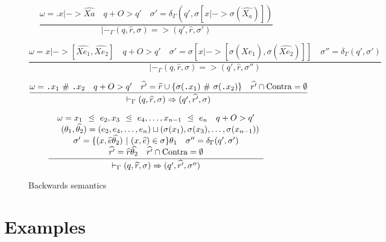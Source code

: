 \documentclass[10pt]{../sigplanconf}
\newcommand{\gen}{\ensuremath{~{\leq\kern-6pt \raisebox{1pt}{$\cdot$}}~}}
\newcommand{\w}[1]{\ensuremath{\widehat{#1}}}
\begin{document}
\begin{figure*}
  \centering
  \begin{equation*}
    \frac{
      \omega = \texttt{.}x |-> \w{Xa}
      \quad q +O> q'
      \quad \sigma' = \delta_\Gamma(q', \sigma[x |-> \sigma(\w{X_a})])
    }
    {
      |-_\Gamma (q, \w{r}, \sigma) => (q', \w{r}, \sigma')
    }
  \end{equation*}

  \begin{equation*}
    \frac{
      \omega = x |-> [\w{Xe_1}, \w{Xe_2}]
      \quad q +O> q'
      \quad \sigma' = \sigma[x |-> [\sigma(\w{Xe_1}), \sigma(\w{Xe_2})]]
      \quad \sigma'' = \delta_\Gamma(q', \sigma')
    }
    {
      |-_\Gamma (q, \w{r}, \sigma) => (q', \w{r}, \sigma'')
    }
  \end{equation*}

  \begin{equation*}
    \frac{
      \omega = \texttt{.}x_1\ \#\ \texttt{.}x_2
      \quad q +O> q'
      \quad \w{r'} = \w{r} \cup \{ \sigma(\texttt{.}x_1)\ \#\ \sigma(\texttt{.}x_2) \}
      \quad \w{r'} \cap {\rm Contra} = \emptyset
    }
    {
      |-_\Gamma (q, \w{r}, \sigma) => (q', \w{r'}, \sigma)
    }
  \end{equation*}

  \begin{equation*}
    \frac{
      \begin{array}{c}
        \omega = x_1\ \gen\ e_2, x_3\ \gen\ e_4, \ldots, x_{n-1}\ \gen\ e_n
        \quad q +O> q' \\
        \quad (\theta_1, \w{\theta_2}) = (e_2, e_4, \ldots, e_{n}) \sqcup (\sigma(x_1), \sigma(x_3), \ldots, \sigma(x_{n-1})) \\
        \sigma' = \{ (x, \w{e} \w{\theta_2}) ~|~ (x, \w{e}) \in \sigma \} \theta_1
        \quad \sigma'' = \delta_\Gamma(q', \sigma') \\
        \w{r'} = \w{r} \w{\theta_2} \quad \w{r'} \cap {\rm Contra} = \emptyset
      \end{array}
    }
    {
      |-_\Gamma (q, \w{r}, \sigma) => (q', \w{r'}, \sigma'')
    }
  \end{equation*}
  \caption{Backwards semantics}
  \label{fig:backwards_semantics}
\end{figure*}

\section{Examples}
\end{document}
